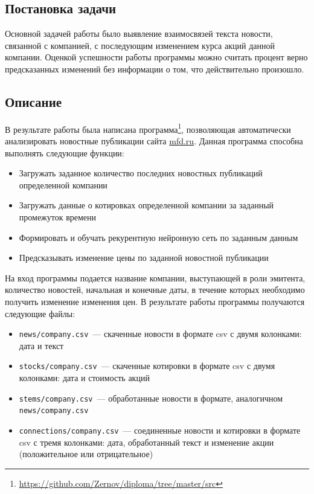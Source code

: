 \documentclass[14pt]{matmex-diploma-custom}
\begin{document}
\subsection{Постановка задачи}

Основной задачей работы было выявление взаимосвязей текста новости, связанной с компанией, с последующим изменением курса акций данной компании. Оценкой успешности работы программы можно считать процент верно предсказанных изменений без информации о том, что действительно произошло. 

\subsection{Описание}

В результате работы была написана программа\footnote{\url{https://github.com/Zernov/diploma/tree/master/src}}, позволяющая автоматически анализировать новостные публикации сайта \url{mfd.ru}. Данная программа способна выполнять следующие функции:

\begin{itemize}
\item Загружать заданное количество последних новостных публикаций определенной компании
\item Загружать данные о котировках определенной компании за заданный промежуток времени
\item Формировать и обучать рекурентную нейронную сеть по заданным данным
\item Предсказывать изменение цены по заданной новостной публикации
\end{itemize}

На вход программы подается название компании, выступающей в роли эмитента, количество новостей, начальная и конечные даты, в течение которых необходимо получить изменение изменения цен. В результате работы программы получаются следующие файлы:

\begin{itemize}
\item \texttt{news/company.csv}~--- скаченные новости в формате csv с двумя колонками: дата и текст
\item \texttt{stocks/company.csv}~--- скаченные котировки в формате csv с двумя колонками: дата и стоимость акций
\item \texttt{stems/company.csv}~--- обработанные новости в формате, аналогичном \texttt{news/company.csv}
\item \texttt{connections/company.csv}~--- соединенные новости и котировки в формате csv с тремя колонками: дата, обработанный текст и изменение акции (положительное или отрицательное)
\end{itemize}
\end{document}
